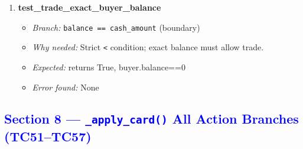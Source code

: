 \documentclass{article}
\begin{document}
\begin{enumerate}[resume, label=\textbf{TC\arabic*.}]
  \item \textbf{test\_trade\_exact\_buyer\_balance}
  \begin{itemize}[noitemsep]
    \item \textit{Branch:} \texttt{balance == cash\_amount} (boundary)
    \item \textit{Why needed:} Strict \texttt{<} condition; exact balance must allow trade.
    \item \textit{Expected:} returns True, buyer.balance==0
    \item \textit{Error found:} None
  \end{itemize}

\end{enumerate}

\subsection*{\textcolor{blue}{Section 8 — \texttt{\_apply\_card()} All Action Branches (TC51–TC57)}}
\end{document}
